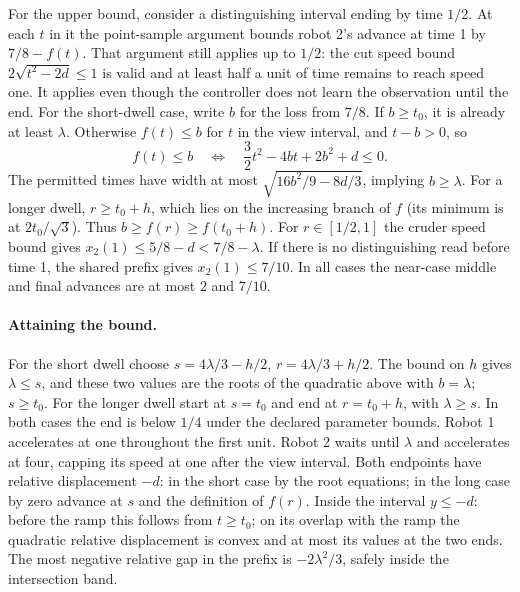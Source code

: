 \documentclass[11pt]{article}
\begin{document}
For the upper bound, consider a distinguishing interval ending
by time \(1/2\). At each \(t\) in it the point-sample argument
bounds robot 2's advance at time 1 by \(7/8-f(t)\).
That argument still applies up to \(1/2\): the cut speed bound
\(2\sqrt{t^2-2d}\le1\) is valid and at least half a unit of
time remains to reach speed one. It applies even though the
controller does not learn the observation until the end.
For the short-dwell case, write \(b\) for the loss from \(7/8\).
If \(b\ge t_0\), it is already at least \(\lambda\).
Otherwise \(f(t)\le b\) for \(t\) in the view interval, and
\(t-b>0\), so
\[
 f(t)\le b \quad\Longleftrightarrow\quad
         \frac32t^2-4bt+2b^2+d\le0 .
\]
The permitted times have width at most
\(\sqrt{16b^2/9-8d/3}\), implying \(b\ge\lambda\).
For a longer dwell, \(r\ge t_0+h\), which lies on the
increasing branch of \(f\) (its minimum is at
\(2t_0/\sqrt3\)). Thus \(b\ge f(r)\ge f(t_0+h)\).
For \(r\in[1/2,1]\) the cruder speed bound gives
\(x_2(1)\le5/8-d<7/8-\lambda\).
If there is no distinguishing read before time 1, the shared
prefix gives \(x_2(1)\le7/10\). In all cases the near-case
middle and final advances are at most \(2\) and \(7/10\).

\paragraph{Attaining the bound.}
For the short dwell choose \(s=4\lambda/3-h/2\),
\(r=4\lambda/3+h/2\). The bound on \(h\) gives
\(\lambda\le s\), and these two values are the roots of
the quadratic above with \(b=\lambda\); \(s\ge t_0\).
For the longer dwell start at \(s=t_0\) and end at
\(r=t_0+h\), with \(\lambda\ge s\).
In both cases the end is below \(1/4\) under the declared
parameter bounds. Robot 1 accelerates at one throughout the
first unit. Robot 2 waits until \(\lambda\) and accelerates
at four, capping its speed at one after the view interval.
Both endpoints have relative displacement \(-d\):
in the short case by the root equations; in the long case
by zero advance at \(s\) and the definition of \(f(r)\).
Inside the interval \(y\le-d\): before the ramp this follows
from \(t\ge t_0\); on its overlap with the ramp the quadratic
relative displacement is convex and at most its values at
the two ends. The most negative relative gap in the prefix
is \(-2\lambda^2/3\), safely inside the intersection band.
\end{document}
